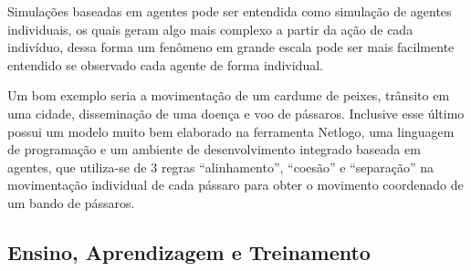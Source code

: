 Simulações baseadas em agentes pode ser entendida como simulação de agentes individuais, os quais geram algo mais complexo a partir da ação de cada indivíduo, dessa forma um fenômeno em grande escala pode ser mais facilmente entendido se observado cada agente de forma individual.

Um bom exemplo seria a movimentação de um cardume de peixes, trânsito em uma cidade, disseminação de uma doença e voo de pássaros. Inclusive esse último possui um modelo muito bem elaborado na ferramenta Netlogo, uma linguagem de programação e um ambiente de desenvolvimento integrado baseada em agentes, que utiliza-se de 3 regras “alinhamento”, “coesão” e “separação” na movimentação individual de cada pássaro para obter o movimento coordenado de um bando de pássaros.

\subsection{Ensino, Aprendizagem e Treinamento}

